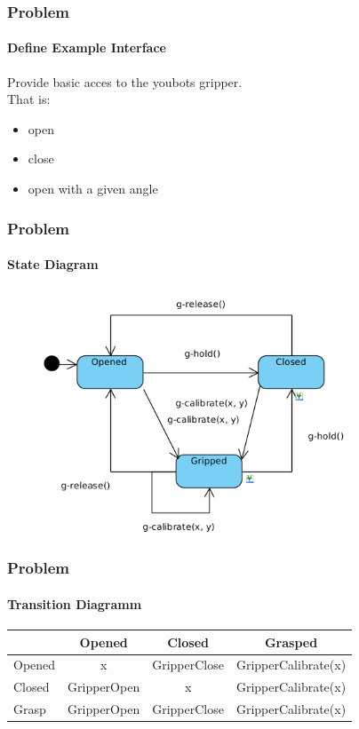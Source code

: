 \documentclass{beamer}
\begin{document}

\begin{frame}
\frametitle{Problem}
  \framesubtitle{Define Example Interface}
  Provide basic acces to the youbots gripper.\\
  That is:
  \begin{itemize}
   \item open
   \item close
   \item open with a given angle 
  \end{itemize}

\end{frame}



\begin{frame}
 \frametitle{Problem}
 \framesubtitle{State Diagram}

 \begin{figure}[ht!]
  \centering
  \includegraphics[width=90mm]{img/statechart.png}
  \caption{}
  \label{State Diagram Of The Gripper}
  \end{figure} 
 \end{frame}
 
 
 \begin{frame}
 \frametitle{Problem}
 \framesubtitle{Transition Diagramm}
 \begin{tabular}{ l | c c c }
            & Opened & Closed & Grasped \\ \hline
  Opened      & x & GripperClose & GripperCalibrate(x) \\
  Closed     & GripperOpen & x  & GripperCalibrate(x) \\
  Grasp     & GripperOpen & GripperClose & GripperCalibrate(x) \\
  
\end{tabular}
\end{frame}
\end{document}
